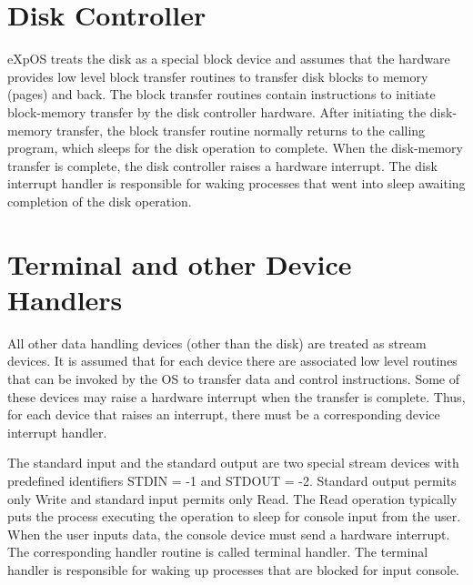 \section{Disk Controller}
eXpOS treats the disk as a special block device and assumes that the hardware provides low level block transfer routines to transfer disk blocks to memory (pages) and back. The block transfer routines contain instructions to initiate block-memory transfer by the disk controller hardware. After initiating the disk-memory transfer, the block transfer routine normally returns to the calling program, which sleeps for the disk operation to complete. When the disk-memory transfer is complete, the disk controller raises a hardware interrupt. The disk interrupt handler is responsible for waking processes that went into sleep awaiting completion of the disk operation.

\section{Terminal and other Device Handlers}
All other data handling devices (other than the disk) are treated as stream devices. It is assumed that for each device there are associated low level routines that can be invoked by the OS to transfer data and control instructions. Some of these devices may raise a hardware interrupt when the transfer is complete. Thus, for each device that raises an interrupt, there must be a corresponding device interrupt handler. 

The standard input and the standard output are two special stream devices with predefined identifiers STDIN = -1 and STDOUT = -2. Standard output permits only Write and standard input permits only Read. The Read operation typically puts the process executing the operation to sleep for console input from the user. When the user inputs data, the console device must send a hardware interrupt. The corresponding handler routine is called terminal handler. The terminal handler is responsible for waking up processes that are blocked for input console.
